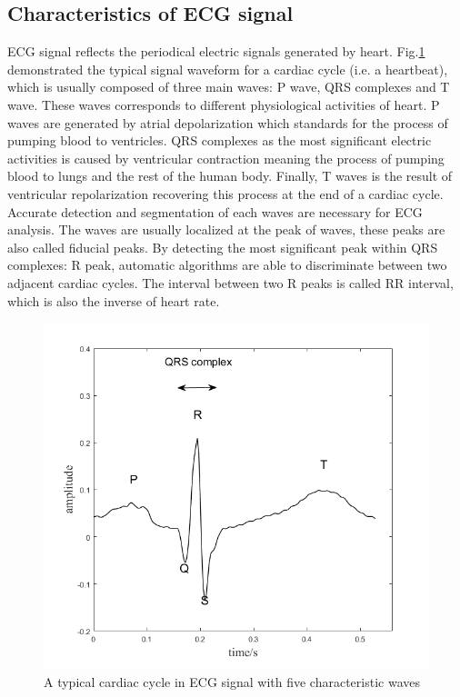 \subsection{Characteristics of ECG signal}

ECG signal reflects the periodical electric signals generated by heart. Fig.\ref{fig:cardiac_cycle} demonstrated the typical signal waveform for a cardiac cycle (i.e. a heartbeat), which is usually composed of three main waves: P wave, QRS complexes and T wave. These waves corresponds to different physiological activities of heart. P waves are generated by atrial depolarization which standards for the process of pumping blood to ventricles. QRS complexes as the most significant electric activities is caused by ventricular contraction meaning the process of pumping blood to lungs and the rest of the human body. Finally, T waves is the result of ventricular repolarization recovering this process at the end of a cardiac cycle. Accurate detection and segmentation of each waves are necessary for ECG analysis. The waves are usually localized at the peak of waves, these peaks are also called fiducial peaks. By detecting the most significant peak within QRS complexes: R peak, automatic algorithms are able to discriminate between two adjacent cardiac cycles. The interval between two R peaks is called RR interval, which is also the inverse of heart rate.

 \begin{figure}[t]
 	\centering
 	\includegraphics[scale=0.75]{Fig/cardiac_cycle.png}
 	\caption{A typical cardiac cycle in ECG signal with five characteristic waves}
 	\label{fig:cardiac_cycle}
 \end{figure}

